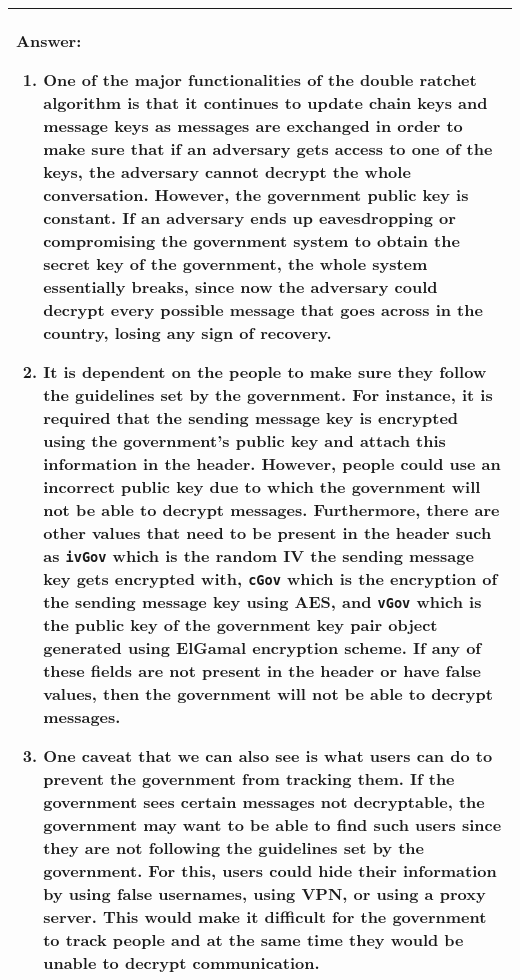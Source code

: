 \documentclass[11pt]{article}
\newenvironment{answer}
{\vspace{2mm}\begin{tabular}{|p{0.9\textwidth}|}
 \hline{\bf Answer:} }{\\ \hline\end{tabular}\vspace{1cm}}
\newenvironment{problems}
{\begin{enumerate}[label=\bfseries Question \arabic*.,align=left,leftmargin=1em,labelwidth=1.5em]}
{\end{enumerate}}
\begin{document}
\begin{problems}
\begin{answer}
\begin{enumerate}
    \item One of the major functionalities of the double ratchet algorithm is that it continues to update chain keys and message keys as messages are exchanged in order to make sure that if an adversary gets access to one of the keys, the adversary cannot decrypt the whole conversation. However, the government public key is constant. If an adversary ends up eavesdropping or compromising the government system to obtain the secret key of the government, the whole system essentially breaks, since now the adversary could decrypt every possible message that goes across in the country, losing any sign of recovery.
    
    \item It is dependent on the people to make sure they follow the guidelines set by the government. For instance, it is required that the sending message key is encrypted using the government's public key and attach this information in the header. However, people could use an incorrect public key due to which the government will not be able to decrypt messages. Furthermore, there are other values that need to be present in the header such as \texttt{ivGov} which is the random IV the sending message key gets encrypted with, \texttt{cGov} which is the encryption of the sending message key using AES, and \texttt{vGov} which is the public key of the government key pair object generated using ElGamal encryption scheme. If any of these fields are not present in the header or have false values, then the government will not be able to decrypt messages.

    \item One caveat that we can also see is what users can do to prevent the government from tracking them. If the government sees certain messages not decryptable, the government may want to be able to find such users since they are not following the guidelines set by the government. For this, users could hide their information by using false usernames, using VPN, or using a proxy server. This would make it difficult for the government to track people and at the same time they would be unable to decrypt communication.
\end{enumerate}




\end{answer}
\end{problems}
\end{document}
